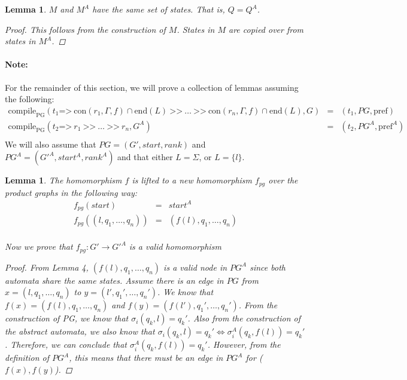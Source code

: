 \documentclass[twocolumn, openany]{sig-alternate-10pt}
\newcommand{\para}[1]{\paragraph*{\textbf{#1}}}
\newcommand{\Prefer}{\texttt{>>}}
\newcommand{\Path}{\texttt{=>}}
\newcommand{\Con}{\mathrm{con}}
\newcommand{\CompilePg}{\ensuremath{\mathrm{compile}_\mathrm{PG}}}
\newcommand{\Pref}{\ensuremath{\mathrm{pref}}}
\newcommand{\EndR}{\ensuremath{\mathrm{end}}}
\newtheorem{lem}[thm]{Lemma}
\begin{document}
\vspace{.5em}
\begin{lem} $M$ and $M^A$ have the same set of states. That is, $Q = Q^A$.
    $ $
    \vspace{1em}
    \begin{proof}
      This follows from the construction of $M$. States in $M$ are copied over from states in $M^A$.
    \end{proof}
\end{lem}

\vspace{1em}
\para{Note:}
For the remainder of this section, we will prove a collection of lemmas assuming the following: 
%
\[
\begin{array}{lll}
  \CompilePg(t_1 \Path~ \Con(r_1,\Gamma,f) \cap \EndR(L) ~\Prefer~ \ldots ~\Prefer~ \Con(r_n,\Gamma,f) \cap \EndR(L), G) &=& (t_1, PG, \Pref) \\
  \CompilePg(t_2 \Path~ r_1 ~\Prefer~ \ldots ~\Prefer~ r_n, G^A) &=& (t_2, PG^A, \Pref^A) \\
\end{array}
\]
%
We will also assume that $PG = (G',start,rank)$ and $PG^A = (G'^A,start^A,rank^A)$ and that either $L = \Sigma$, or $L = \{ l \}$.
\vspace{2em}


\begin{lem}
  The homomorphism $f$ is lifted to a new homomorphism $f_{pg}$ over the product graphs in the following way:
  \[ \begin{array}{rcl}
    f_{pg}( start ) & = & start^A  \\
    f_{pg}( (l,q_1,\ldots,q_n) ) & = & (f(l),q_1,\ldots,q_n) \\
  \end{array} \]

  Now we prove that $f_{pg}: G' \rightarrow G'^A$ is a valid homomorphism
  \begin{proof}
    From Lemma 4, $(f(l),q_1,\ldots,q_n)$ is a valid node in $PG^A$ since both automata share the same states. 
    Assume there is an edge in $PG$ from $x=(l,q_1,\ldots,q_n)$
    to $y=(l',q_1',\ldots,q_n')$. We know that $f(x) = (f(l),q_1,\ldots,q_n)$ and $f(y) = (f(l'),q_1',\ldots,q_n')$.
    From the construction of PG, we know that $\sigma_i(q_k, l) = q_k'$. 
    Also from the construction of the abstract automata, we also know that $\sigma_i(q_k, l) = q_k' \iff \sigma^A_i(q_k, f(l)) = q_k'$. Therefore, we can conclude that $\sigma^A_i(q_k, f(l)) = q_k'$. However, from the definition of $PG^A$, this means that there must be an edge in $PG^A$ for ($f(x),f(y)$).
  \end{proof}
\end{lem}
\end{document}
